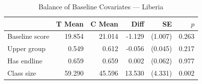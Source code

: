 \begin{table}[htbp]
\centering
\small
\caption{Balance of Baseline Covariates --- Liberia}
\label{tab:lib_balance}
\begin{tabular}{l*{5}{r}}
\toprule
 & T Mean & C Mean & Diff & SE & $p$ \\
\midrule
Baseline score & 19.854 & 21.014 & -1.129 & (1.007) & 0.263 \\
Upper group & 0.549 & 0.612 & -0.056 & (0.045) & 0.217 \\
Has endline & 0.659 & 0.659 & 0.002 & (0.062) & 0.977 \\
Class size & 59.290 & 45.596 & 13.530 & (4.331) & 0.002 \\
\bottomrule
\end{tabular}
\par\smallskip{}
\end{table}
